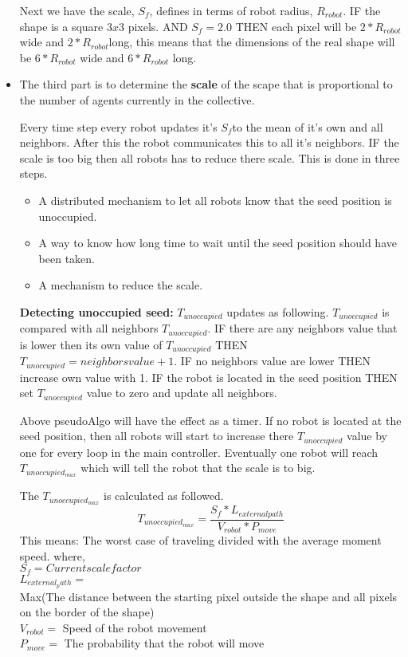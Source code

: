\begin{itemize}
Next we have the scale, $S_f$, defines in terms of robot radius, $R_{robot}$.
IF the shape is a  square $3x3$ pixels. AND $S_f = 2.0$
THEN each pixel will be $2*R_{robot}$ wide and  $2*R_{robot} $long, this means that the dimensions of the real shape will be  $6*R_{robot}$ wide and  $6*R_{robot}$ long.

\item The third part is to determine the \textbf{scale} of the scape that is proportional to the number of agents currently in the collective.

Every time step every robot updates it’s  $S_f $to the mean of it’s own and all neighbors. 
After this the robot communicates this to all it’s neighbors.
IF the scale is too big then all robots has to reduce there scale. This is done in three steps.
\begin{itemize}
\item A distributed mechanism to let all robots know that the seed position is unoccupied.
\item A way to know how long time to wait until the seed position should have been taken.
\item A mechanism to reduce the scale.
\end{itemize}


\textbf{Detecting unoccupied seed:}
$T_{unoccupied}$ updates as following. $T_{unoccupied}$ is compared with all neighbors $T_{unoccupied}$.
IF there are any neighbors value that is lower then its own value of $T_{unoccupied}$ THEN $T_{unoccupied} = neighbors value + 1$.
IF no neighbors value are lower THEN increase own value with 1.
IF the robot is located in the seed position THEN set $T_{unoccupied}$ value to zero and update all neighbors.

Above pseudoAlgo will have the effect as a timer. If no robot is located at the seed position, then all robots will start to increase there $T_{unoccupied}$ value by one for every loop in the main controller.
Eventually one robot will reach $T_{unoccupied_{max}}$ which will tell the robot that the scale is to big.

The $T_{unoccupied_{max}}$ is calculated as followed.
\begin{equation}
T_{unoccupied_{max}} = \frac{S_{f} * L_{externalpath}} {V_{robot}*P_{move}}
\end{equation}
This means: The worst case of traveling  divided with the average moment speed.
where,\\
$S_f	= Current scale factor$\\
$L_{external_path} =$\\ Max(The distance between the starting pixel outside the shape and all pixels on the border of the shape)\\
$V_{robot} =$ Speed of the robot movement\\
$P_{move}	 =$ The probability that the robot will move


\end{itemize}
